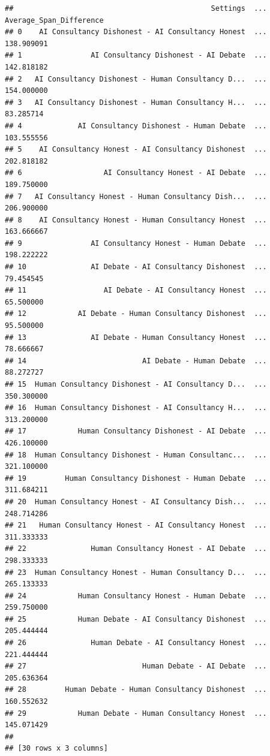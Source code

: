 \documentclass[
]{article}
\begin{document}
\begin{verbatim}
##                                              Settings  ...  Average_Span_Difference
## 0    AI Consultancy Dishonest - AI Consultancy Honest  ...               138.909091
## 1                AI Consultancy Dishonest - AI Debate  ...               142.818182
## 2   AI Consultancy Dishonest - Human Consultancy D...  ...               154.000000
## 3   AI Consultancy Dishonest - Human Consultancy H...  ...                83.285714
## 4             AI Consultancy Dishonest - Human Debate  ...               103.555556
## 5    AI Consultancy Honest - AI Consultancy Dishonest  ...               202.818182
## 6                   AI Consultancy Honest - AI Debate  ...               189.750000
## 7   AI Consultancy Honest - Human Consultancy Dish...  ...               206.900000
## 8    AI Consultancy Honest - Human Consultancy Honest  ...               163.666667
## 9                AI Consultancy Honest - Human Debate  ...               198.222222
## 10               AI Debate - AI Consultancy Dishonest  ...                79.454545
## 11                  AI Debate - AI Consultancy Honest  ...                65.500000
## 12            AI Debate - Human Consultancy Dishonest  ...                95.500000
## 13               AI Debate - Human Consultancy Honest  ...                78.666667
## 14                           AI Debate - Human Debate  ...                88.272727
## 15  Human Consultancy Dishonest - AI Consultancy D...  ...               350.300000
## 16  Human Consultancy Dishonest - AI Consultancy H...  ...               313.200000
## 17            Human Consultancy Dishonest - AI Debate  ...               426.100000
## 18  Human Consultancy Dishonest - Human Consultanc...  ...               321.100000
## 19         Human Consultancy Dishonest - Human Debate  ...               311.684211
## 20  Human Consultancy Honest - AI Consultancy Dish...  ...               248.714286
## 21   Human Consultancy Honest - AI Consultancy Honest  ...               311.333333
## 22               Human Consultancy Honest - AI Debate  ...               298.333333
## 23  Human Consultancy Honest - Human Consultancy D...  ...               265.133333
## 24            Human Consultancy Honest - Human Debate  ...               259.750000
## 25            Human Debate - AI Consultancy Dishonest  ...               205.444444
## 26               Human Debate - AI Consultancy Honest  ...               221.444444
## 27                           Human Debate - AI Debate  ...               205.636364
## 28         Human Debate - Human Consultancy Dishonest  ...               160.552632
## 29            Human Debate - Human Consultancy Honest  ...               145.071429
## 
## [30 rows x 3 columns]
\end{verbatim}
\end{document}
